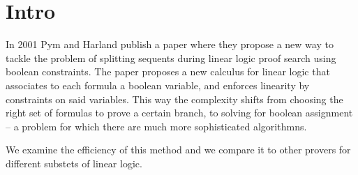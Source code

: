 \documentclass[a4paper, 12pt, tesi, english]{report}
\begin{document}
\tableofcontents

\chapter{Intro}
In 2001 Pym and Harland publish a paper \cite{HarlandPym} where they propose a new way to tackle the problem of splitting sequents during linear logic proof search using boolean constraints.
The paper proposes a new calculus for linear logic that associates to each formula a boolean variable, and enforces linearity by constraints on said variables.
This way the complexity shifts from choosing the right set of formulas to prove a certain branch, to solving for boolean assignment -- a problem for which there are much more sophisticated algorithmns.

We examine the efficiency of this method and we compare it to other provers for different substets of linear logic.
\end{document}
